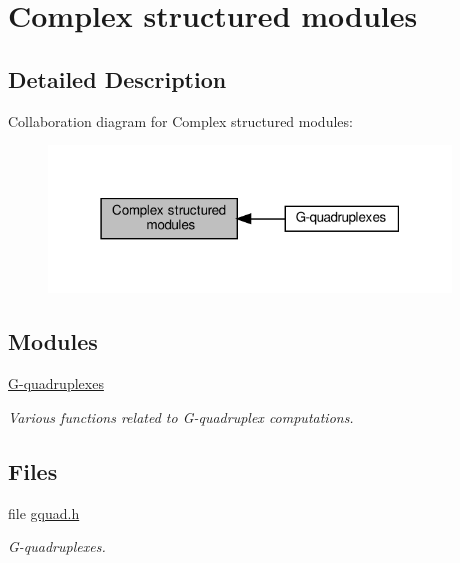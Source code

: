\hypertarget{group__paired__modules}{}\section{Complex structured modules}
\label{group__paired__modules}


\subsection{Detailed Description}
Collaboration diagram for Complex structured modules\+:
\nopagebreak
\begin{figure}[H]
\begin{center}
\leavevmode
\includegraphics[width=303pt]{group__paired__modules}
\end{center}
\end{figure}
\subsection*{Modules}
\begin{DoxyCompactItemize}
\item 
\hyperlink{group__gquads}{G-\/quadruplexes}
\begin{DoxyCompactList}\small\item\em Various functions related to G-\/quadruplex computations. \end{DoxyCompactList}\end{DoxyCompactItemize}
\subsection*{Files}
\begin{DoxyCompactItemize}
\item 
file \hyperlink{gquad_8h}{gquad.\+h}
\begin{DoxyCompactList}\small\item\em G-\/quadruplexes. \end{DoxyCompactList}\end{DoxyCompactItemize}
